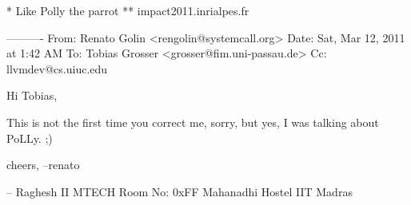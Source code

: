      * Like Polly the parrot
     ** impact2011.inrialpes.fr

     ----------
     From: Renato Golin <rengolin@systemcall.org>
     Date: Sat, Mar 12, 2011 at 1:42 AM
     To: Tobias Grosser <grosser@fim.uni-passau.de>
     Cc: llvmdev@cs.uiuc.edu


     Hi Tobias,

     This is not the first time you correct me, sorry, but yes, I was
     talking about PoLLy. ;)

     cheers,
     --renato




     -- 
     Raghesh
     II MTECH
     Room No: 0xFF
     Mahanadhi Hostel
     IIT Madras
     

